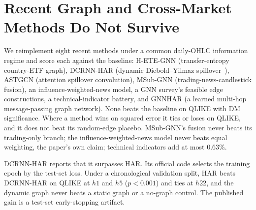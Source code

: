 \documentclass{llncs}
\begin{document}
\FloatBarrier
\section{Recent Graph and Cross-Market Methods Do Not Survive}
We reimplement eight recent methods under a common daily-OHLC information regime and score each against the
baseline: H-ETE-GNN (transfer-entropy country-ETF graph), DCRNN-HAR (dynamic Diebold--Yilmaz spillover~\cite{dy2012}), ASTGCN
(attention spillover convolution), MSub-GNN (trading-news-candlestick fusion), an influence-weighted-news model, a
GNN survey's feasible edge constructions, a technical-indicator battery, and GNNHAR (a learned multi-hop
message-passing graph network). None beats the baseline on QLIKE with
DM significance. Where a method wins on squared error it ties or loses on QLIKE, and it does not beat its
random-edge placebo. MSub-GNN's fusion never beats its trading-only branch; the influence-weighted-news model
never beats equal weighting, the paper's own claim; technical indicators add at most 0.63\%.

DCRNN-HAR reports that it surpasses HAR. Its official code selects the training epoch by the test-set loss. Under
a chronological validation split, HAR beats DCRNN-HAR on QLIKE at $h1$ and $h5$ ($p<0.001$) and ties at $h22$, and the
dynamic graph never beats a static graph or a no-graph control. The published gain is a test-set early-stopping
artifact.
\end{document}

